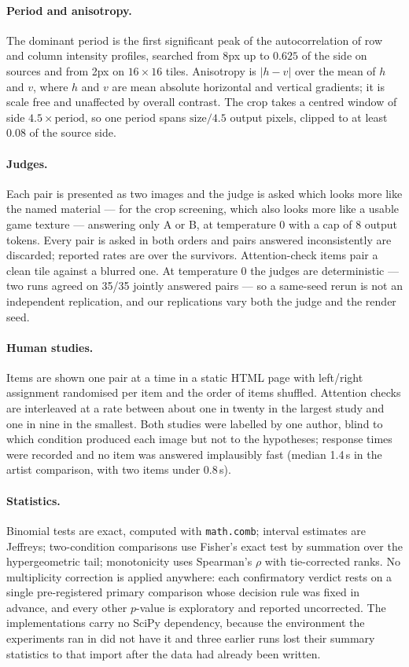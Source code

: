 \documentclass{article}
\begin{document}
\paragraph{Period and anisotropy.} The dominant period is the first
significant peak of the autocorrelation of row and column intensity profiles,
searched from 8px up to $0.625$ of the side on sources and from 2px on
$16\times16$ tiles. Anisotropy is $|h-v|$ over the mean of $h$ and $v$, where
$h$ and $v$ are mean absolute horizontal and vertical gradients; it is scale
free and unaffected by overall contrast. The crop takes a centred window of
side $4.5\times\text{period}$, so one period spans $\text{size}/4.5$ output
pixels, clipped to at least $0.08$ of the source side.

\paragraph{Judges.} Each pair is presented as two images and the judge is
asked which looks more like the named material --- for the crop screening,
which also looks more like a usable game texture --- answering only A or B,
at temperature 0 with a cap of 8 output
tokens. Every pair is asked in both orders and pairs answered inconsistently
are discarded; reported rates are over the survivors. Attention-check items
pair a clean tile against a blurred one. At temperature 0 the judges are
deterministic --- two runs agreed on 35/35 jointly answered pairs --- so a
same-seed rerun is not an independent replication, and our replications vary
both the judge and the render seed.

\paragraph{Human studies.} Items are shown one pair at a time in a static
HTML page with left/right assignment randomised per item and the order of
items shuffled. Attention checks are interleaved at a rate between about one in
twenty in the largest study and one in nine in the smallest. Both studies were labelled by one author, blind to which condition
produced each image but not to the hypotheses; response times were recorded
and no item was answered implausibly fast (median 1.4\,s in the
artist comparison, with two items under $0.8$\,s).

\paragraph{Statistics.} Binomial tests are exact, computed with
\texttt{math.comb}; interval estimates are Jeffreys; two-condition
comparisons use Fisher's exact test by summation over the hypergeometric
tail; monotonicity uses Spearman's $\rho$ with tie-corrected ranks. No
multiplicity correction is applied anywhere: each confirmatory verdict rests
on a single pre-registered primary comparison whose decision rule was fixed
in advance, and every other $p$-value is exploratory and reported
uncorrected. The
implementations carry no SciPy dependency, because the environment the
experiments ran in did not have it and three earlier runs lost their summary
statistics to that import after the data had already been written.
\end{document}
